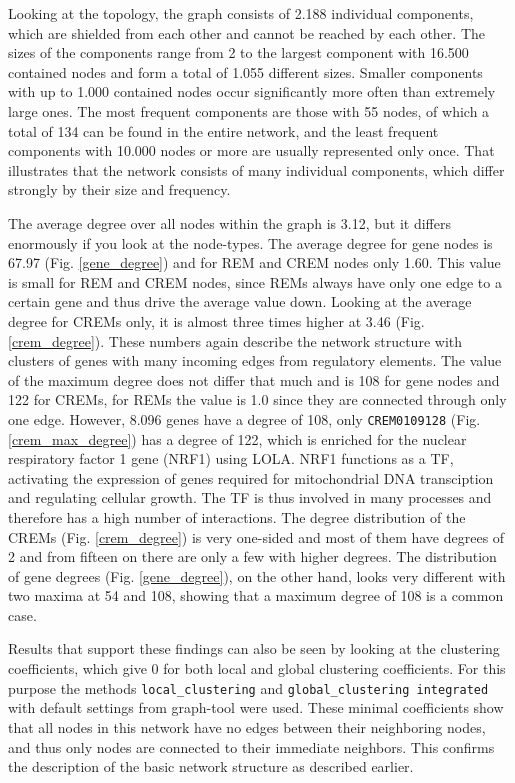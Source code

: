 \documentclass[pdftex,12pt,a4paper]{report}
\begin{document}
Looking at the topology, the graph consists of 2.188 individual components, which are shielded from each other and cannot be reached by each other. The sizes of the components range from 2 to the largest component with 16.500 contained nodes and form a total of 1.055 different sizes. Smaller components with up to 1.000 contained nodes occur significantly more often than extremely large ones. The most frequent components are those with 55 nodes, of which a total of 134 can be found in the entire network, and the least frequent components with 10.000 nodes or more are usually represented only once. That illustrates that the network consists of many individual components, which differ strongly by their size and frequency.


The average degree over all nodes within the graph is 3.12, but it differs enormously if you look at the node-types. The average degree for gene nodes is 67.97 (Fig. \ref{gene_degree}) and for REM and CREM nodes only 1.60. This value is small for REM and CREM nodes, since REMs always have only one edge to a certain gene and thus drive the average value down. Looking at the average degree for CREMs only, it is almost three times higher at 3.46 (Fig. \ref{crem_degree}). These numbers again describe the network structure with clusters of genes with many incoming edges from regulatory elements. The value of the maximum degree does not differ that much and is 108 for gene nodes and 122 for CREMs, for REMs the value is 1.0 since they are connected through only one edge. However, 8.096 genes have a degree of 108, only \texttt{CREM0109128} (Fig. \ref{crem_max_degree}) has a degree of 122, which is enriched for the nuclear respiratory factor 1 gene (NRF1) using LOLA\cite{LOLA}. NRF1 functions as a TF, activating the expression of genes required for mitochondrial DNA transciption and regulating cellular growth\cite{NRF1}. The TF is thus involved in many processes and therefore has a high number of interactions.
The degree distribution of the CREMs (Fig. \ref{crem_degree}) is very one-sided and most of them have degrees of 2 and from fifteen on there are only a few with higher degrees. The distribution of gene degrees (Fig. \ref{gene_degree}), on the other hand, looks very different with two maxima at 54 and 108, showing that a maximum degree of 108 is a common case. 

Results that support these findings can also be seen by looking at the clustering coefficients, which give 0 for both local and global clustering coefficients.  For this purpose the methods \texttt{local\_clustering} and \texttt{global\_clustering integrated} with default settings from graph-tool were used. These minimal coefficients show that all nodes in this network have no edges between their neighboring nodes, and thus only nodes are connected to their immediate neighbors. This confirms the description of the basic network structure as described earlier.
\end{document}
